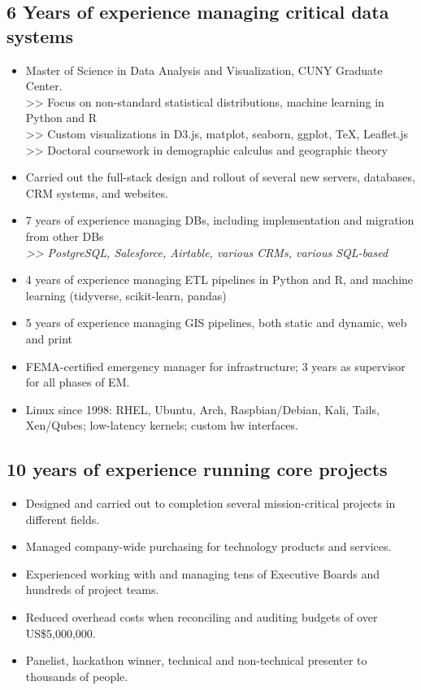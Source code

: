 \documentclass[]{deedy-resume-openfont}
\begin{document}
\subsection{6 Years of experience managing critical data systems}
\vspace{\topsep}
    \begin{itemize}
        \item Master of Science in Data Analysis and Visualization, CUNY Graduate Center. \\
        >> Focus on non-standard statistical distributions, machine learning in Python and R \\
        >> Custom visualizations in D3.js, matplot, seaborn, ggplot, \TeX, Leaflet.js \\
        >> Doctoral coursework in demographic calculus and geographic theory
        \item Carried out the full-stack design and rollout of several new servers, databases, CRM systems, and websites.
        \item 7 years of experience managing DBs, including implementation and migration from other DBs \\ \textit{>> PostgreSQL, Salesforce, Airtable, various CRMs, various SQL-based}
        \item 4 years of experience managing ETL pipelines in Python and R, and machine learning (tidyverse, scikit-learn, pandas)
        \item 5 years of experience managing GIS pipelines, both static and dynamic, web and print
        \item FEMA-certified emergency manager for infrastructure; 3 years as supervisor for all phases of EM.
        \item Linux since 1998: RHEL, Ubuntu, Arch, Raspbian/Debian, Kali, Tails, Xen/Qubes; low-latency kernels; custom hw interfaces.
    \end{itemize}
\subsection{10 years of experience running core projects}
\vspace{\topsep}
\begin{itemize} 
    \item Designed and carried out to completion several mission-critical projects in different fields.
    \item Managed company-wide purchasing for technology products and services.
    \item Experienced working with and managing tens of Executive Boards and hundreds of project teams.
    \item Reduced overhead costs when reconciling and auditing budgets of over US\$5,000,000.
    \item Panelist, hackathon winner, technical and non-technical presenter to thousands of people.
	\end{itemize}
\end{document}
